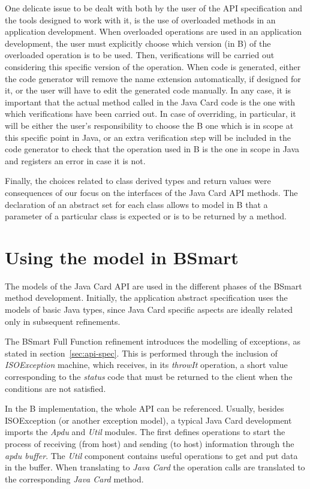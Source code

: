 \documentclass{llncs}
\begin{document}
One delicate issue to be dealt with both by the user of the API
specification and the tools designed to work with it, is the use of
overloaded methods in an application development. When overloaded
operations are used in an application development, the user must
explicitly choose which version (in B) of the overloaded operation is to be
used. Then, verifications will be carried out considering this
specific version of the operation. When code is generated, either the
code generator will remove the name extension automatically, if
designed for it, or the user will have to edit the generated code
manually. In any case, it is important that the actual method called
in the Java Card code is the one with which verifications have been
carried out.  In case of overriding, in particular, it will be either
the user's responsibility to choose the B one which is in scope at
this specific point in Java, or an extra verification step will be
included in the code generator to check that the operation used in
B is the one in scope in Java and registers an error in case it is
not.

Finally, the choices related to class derived types and return values were consequences of our focus on the interfaces of the Java Card API methods. The declaration of an abstract set for each class allows to model in B that a parameter of a particular class is expected or is to be returned by a method. 




\section{Using the model in BSmart}\label{sec:using-the-API}

The models of the Java Card API are used in the different phases of the 
BSmart method development. Initially, the application 
abstract specification uses the models of basic Java types, 
since Java Card specific aspects are ideally related only
in subsequent refinements.

The BSmart Full Function refinement introduces the modelling of exceptions, 
as stated in section~\ref{sec:api-spec}. This is performed through  the inclusion
of \emph{ISOException} machine, which receives, in its \emph{throwIt} operation, 
a short value corresponding to the \emph{status} code that must be returned to 
the client when the conditions are not satisfied.  

In the B implementation, the whole API can be referenced. Usually,
besides ISOException (or another exception model), a typical Java Card
development imports the \emph{Apdu} and \emph{Util} modules. The first
defines operations to start the process of receiving (from host) and
sending (to host) information through the \emph{apdu buffer}.  
The \emph{Util} component contains useful
operations to get and put data in the buffer. When
translating to \emph{Java Card} the operation calls are translated
to the corresponding \emph{Java Card} method.
\end{document}
